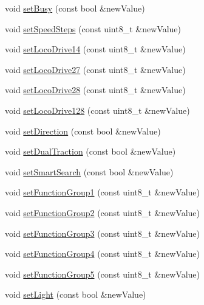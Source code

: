 \begin{DoxyCompactItemize}
\item 
void \hyperlink{classIoTT_1_1LocDecoder_aa1cd277d6a76d8dd565df804527d46f9}{set\+Busy} (const bool \&new\+Value)
\item 
void \hyperlink{classIoTT_1_1LocDecoder_ae05b9d11871c659a286f58e810db5983}{set\+Speed\+Steps} (const uint8\+\_\+t \&new\+Value)
\item 
void \hyperlink{classIoTT_1_1LocDecoder_a32fc785fece905c89118bca8f3120cfc}{set\+Loco\+Drive14} (const uint8\+\_\+t \&new\+Value)
\item 
void \hyperlink{classIoTT_1_1LocDecoder_ab85bb0abdc9f3f2f4e8fb8fdad6949ba}{set\+Loco\+Drive27} (const uint8\+\_\+t \&new\+Value)
\item 
void \hyperlink{classIoTT_1_1LocDecoder_aebe429e758b5cbe2fd4ad3e04d854711}{set\+Loco\+Drive28} (const uint8\+\_\+t \&new\+Value)
\item 
void \hyperlink{classIoTT_1_1LocDecoder_af308320a9ae794af3cd1f20b46a7d639}{set\+Loco\+Drive128} (const uint8\+\_\+t \&new\+Value)
\item 
void \hyperlink{classIoTT_1_1LocDecoder_a028107eb566eee57a5590ccd90432e4e}{set\+Direction} (const bool \&new\+Value)
\item 
void \hyperlink{classIoTT_1_1LocDecoder_a94ff7a99963e07ea39c7a4ea09f9b9a1}{set\+Dual\+Traction} (const bool \&new\+Value)
\item 
void \hyperlink{classIoTT_1_1LocDecoder_acdda1c9b2f6f792bc1a3d246e12d3aeb}{set\+Smart\+Search} (const bool \&new\+Value)
\item 
void \hyperlink{classIoTT_1_1LocDecoder_a85f76a68886d3470c2aaab641855b6b6}{set\+Function\+Group1} (const uint8\+\_\+t \&new\+Value)
\item 
void \hyperlink{classIoTT_1_1LocDecoder_a602470c858cfd13382f9180d6c768051}{set\+Function\+Group2} (const uint8\+\_\+t \&new\+Value)
\item 
void \hyperlink{classIoTT_1_1LocDecoder_a2698876fc3124c833e15a7ff3fa884d6}{set\+Function\+Group3} (const uint8\+\_\+t \&new\+Value)
\item 
void \hyperlink{classIoTT_1_1LocDecoder_af4965ab85d13a4f165643c11562a295e}{set\+Function\+Group4} (const uint8\+\_\+t \&new\+Value)
\item 
void \hyperlink{classIoTT_1_1LocDecoder_a0649a1986d8954e4a13d8c3fe9b28e6a}{set\+Function\+Group5} (const uint8\+\_\+t \&new\+Value)
\item 
void \hyperlink{classIoTT_1_1LocDecoder_a5eb292204c101454c4300e3c6f9e818e}{set\+Light} (const bool \&new\+Value)
\item 

\end{DoxyCompactItemize}
